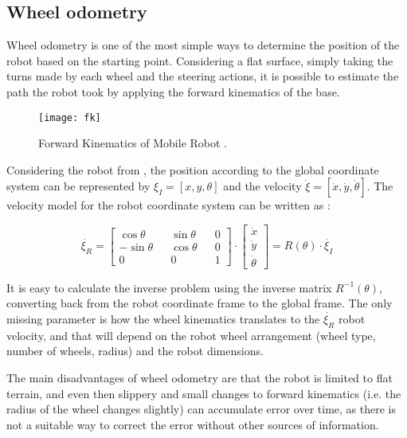 \subsection{Wheel odometry}

Wheel odometry is one of the most simple ways to determine the position of the robot based on the starting point. Considering a flat surface, simply taking the turns made by each wheel and the steering actions, it is possible to estimate the path the robot took by applying the forward kinematics of the base.

\begin{figure}
    \centering
    \texttt{[image: fk]}
    \caption{Forward Kinematics of Mobile Robot \cite{thrun2005probabilistic}.}
    \label{fig:fk}
\end{figure}

Considering the robot from , the position according to the global coordinate system can be represented by $\xi_I = [x, y, \theta]$ and the velocity $\dot{\xi} = [\dot{x}, \dot{y}, \dot{\theta}]$. The velocity model for the robot coordinate system can be written as \cite{thrun2005probabilistic}:

\begin{equation}
\dot{\xi_R} = 
\begin{bmatrix}
\cos \theta && \sin \theta && 0 \\
- \sin \theta  && \cos \theta && 0 \\
0 && 0 && 1
\end{bmatrix}
\cdot 
\begin{bmatrix}
\dot{x} \\
\dot{y} \\
\dot{\theta}
\end{bmatrix}
=
R(\theta) \cdot \dot{\xi_I}
\end{equation}

It is easy to calculate the inverse problem using the inverse matrix $R^{-1}(\theta)$, converting back from the robot coordinate frame to the global frame. The only missing parameter is how the wheel kinematics translates to the $\dot{\xi_R}$ robot velocity, and that will depend on the robot wheel arrangement (wheel type, number of wheels, radius) and the robot dimensions.

The main disadvantages of wheel odometry are that the robot is limited to flat terrain, and even then slippery and small changes to forward kinematics (i.e. the radius of the wheel changes slightly) can accumulate error over time, as there is not a suitable way to correct the error without other sources of information.

